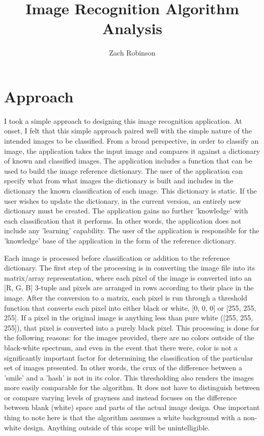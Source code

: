 \documentclass[11pt]{article} %
\title{Image Recognition Algorithm Analysis}
\author{Zach Robinson}
\begin{document}
\maketitle

\section{Approach}

I took a simple approach to designing this image recognition application. At onset, I felt that this simple approach paired well with the simple nature of the intended images to be classified. From a broad perspective, in order to classify an image, the application takes the input image and compares it against a dictionary of known and classified images. The application includes a function that can be used to build the image reference dictionary. The user of the application can specify what from what images the dictionary is built and includes in the dictionary the known classification of each image. This dictionary is static. If the user wishes to update the dictionary, in the current version, an entirely new dictionary must be created. The application gains no further 'knowledge' with each classification that it performs. In other words, the application does not include any 'learning' capability. The user of the application is responsible for the 'knowledge' base of the application in the form of the reference dictionary. 

Each image is processed before classification or addition to the reference dictionary. The first step of the processing is in converting the image file into its matrix/array representation, where each pixel of the image is converted into an [R, G, B] 3-tuple and pixels are arranged in rows according to their place in the image. After the conversion to a matrix, each pixel is run through a threshold function that converts each pixel into either black or white, [0, 0, 0] or [255, 255, 255]. If a pixel in the original image is anything less than pure white ([255, 255, 255]), that pixel is converted into a purely black pixel. This processing is done for the following reasons: for the images provided, there are no colors outside of the black-white spectrum, and even in the event that there were, color is not a significantly important factor for determining the classification of the particular set of images presented. In other words, the crux of the difference between a 'smile' and a 'hash' is not in its color. This thresholding also renders the images more easily comparable for the algorithm. It does not have to distinguish between or compare varying levels of grayness and instead focuses on the difference between blank (white) space and parts of the actual image design. One important thing to note here is that the algorithm assumes a white background with a non-white design. Anything outside of this scope will be unintelligible. 
\end{document}
